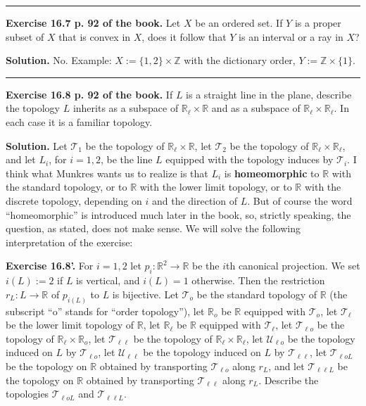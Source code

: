 \documentclass[12pt,letterpaper]{article}
\newcommand{\hs}{\bigskip\hrule\medskip}
\newcommand{\mc}{\mathcal}
\newcommand{\noi}{\noindent}%
\newcommand{\R}{\mathbb R}
\newcommand{\T}{\mathcal T}
\newcommand{\Z}{\mathbb Z}
\begin{document}
\hs

\noi\textbf{Exercise 16.7 p. 92 of the book.} Let $X$ be an ordered set. If $Y$ is a proper subset of $X$ that is convex in $X$, does it follow that $Y$ is an interval or a ray in $X$? 

\noi\textbf{Solution.} No. Example: $X:=\{1,2\}\times\Z$ with the dictionary order, $Y:=\Z\times\{1\}$. 

\hs

\noi\textbf{Exercise 16.8 p. 92 of the book.} If $L$ is a straight line in the plane, describe the topology $L$ inherits as a subspace of $\R_\ell\times\R$ and as a subspace of $\R_\ell\times\R_\ell$. In each case it is a familiar topology. 

\noi\textbf{Solution.} Let $\T_1$ be the topology of $\R_\ell\times\R$, let $\T_2$ be the topology of $\R_\ell\times\R_\ell$, and let $L_i$, for $i=1,2$, be the line $L$ equipped with the topology induces by $\T_i$. I think what Munkres wants us to realize is that $L_i$ is \textbf{homeomorphic} to $\R$ with the standard topology, or to $\R$ with the lower limit topology, or to $\R$ with the discrete topology, depending on $i$ and the direction of $L$. But of course the word ``homeomorphic'' is introduced much later in the book, so, strictly speaking, the question, as stated, does not make sense. We will solve the following interpretation of the exercise: 

\noi\textbf{Exercise 16.8'.} For $i=1,2$ let $p_i:\R^2\to\R$ be the $i$th canonical projection. We set $i(L):=2$ if $L$ is vertical, and $i(L)=1$ otherwise. Then the restriction $r_L:L\to\R$ of $p_{i(L)}$ to $L$ is bijective. Let $\T_o$ be the standard topology of $\R$ (the subscript ``o'' stands for ``order topology''), let $\R_o$ be $\R$ equipped with $\T_o$, let $\T_\ell$ be the lower limit topology of $\R$, let $\R_\ell$ be $\R$ equipped with $\T_\ell$, let $\T_{\ell o}$ be the topology of $\R_\ell\times\R_o$, let $\T_{\ell\ell}$ be the topology of $\R_\ell\times\R_\ell$, let $\mc U_{\ell o}$ be the topology induced on $L$ by $\T_{\ell o}$, let $\mc U_{\ell\ell}$ be the topology induced on $L$ by $\T_{\ell\ell}$, let $\T_{\ell oL}$ be the topology on $\R$ obtained by transporting $\T_{\ell o}$ along $r_L$, and let $\T_{\ell\ell L}$ be the topology on $\R$ obtained by transporting $\T_{\ell\ell}$ along $r_L$. Describe the topologies $\T_{\ell oL}$ and $\T_{\ell\ell L}$. 
\end{document}

